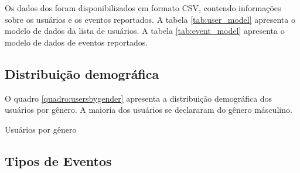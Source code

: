 Os dados dos foram disponibilizados em formato CSV, contendo informações sobre os usuários e os eventos reportados. A tabela \autoref{tab:user_model} apresenta o modelo de dados da lista de usuários. A tabela \autoref{tab:event_model} apresenta o modelo de dados de eventos reportados.

\subsection*{Distribuição demográfica}

O quadro \autoref{quadro:usersbygender} apresenta a distribuição demográfica dos usuários por gênero. A maioria dos usuários se declararam do gênero másculino. 


\begin{quadro}[htb]
    \caption{Usuários por gênero}
    \label{quadro:usersbygender}
    \centering
\end{quadro}

\subsection{Tipos de Eventos}

